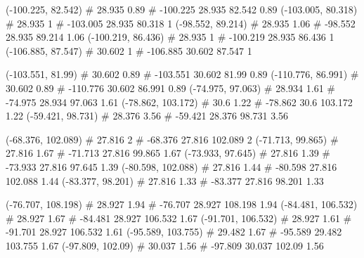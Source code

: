 \documentclass[a4paper,openbib,10pt]{article}
\newenvironment{treegraph}{\begin{graph}}{\end{graph}}
\begin{document}
\begin{treegraph}
  (-100.225, 82.542) #     28.935    0.89
   #    -100.225    28.935    82.542    0.89
  (-103.005, 80.318) #     28.935    1
   #    -103.005    28.935    80.318    1
  (-98.552, 89.214) #     28.935    1.06
   #    -98.552    28.935    89.214    1.06
  (-100.219, 86.436) #     28.935    1
   #    -100.219    28.935    86.436    1
  (-106.885, 87.547) #     30.602    1
   #    -106.885    30.602    87.547    1

  (-103.551, 81.99) #     30.602    0.89
   #    -103.551    30.602    81.99    0.89
  (-110.776, 86.991) #     30.602    0.89
   #    -110.776    30.602    86.991    0.89
  (-74.975, 97.063) #     28.934    1.61
   #    -74.975    28.934    97.063    1.61
  (-78.862, 103.172) #     30.6    1.22
   #    -78.862    30.6    103.172    1.22
  (-59.421, 98.731) #     28.376    3.56
   #    -59.421    28.376    98.731    3.56

  (-68.376, 102.089) #     27.816    2
   #    -68.376    27.816    102.089    2
  (-71.713, 99.865) #     27.816    1.67
   #    -71.713    27.816    99.865    1.67
  (-73.933, 97.645) #     27.816    1.39
   #    -73.933    27.816    97.645    1.39
  (-80.598, 102.088) #     27.816    1.44
   #    -80.598    27.816    102.088    1.44
  (-83.377, 98.201) #     27.816    1.33
   #    -83.377    27.816    98.201    1.33

  (-76.707, 108.198) #     28.927    1.94
   #    -76.707    28.927    108.198    1.94
  (-84.481, 106.532) #     28.927    1.67
   #    -84.481    28.927    106.532    1.67
  (-91.701, 106.532) #     28.927    1.61
   #    -91.701    28.927    106.532    1.61
  (-95.589, 103.755) #     29.482    1.67
   #    -95.589    29.482    103.755    1.67
  (-97.809, 102.09) #     30.037    1.56
   #    -97.809    30.037    102.09    1.56


\end{treegraph}
\end{document}
